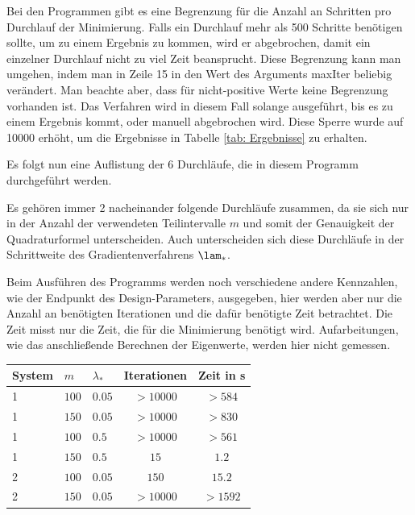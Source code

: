\documentclass[a4paper,12pt]{report}
\newcommand{\zitat}[1]{\glqq #1\grqq}
\newcommand{\1}{\mathds{1}}
\theoremstyle{plain} %
\theoremstyle{definition} %
\theoremstyle{remark}
\begin{document}
            Bei den Programmen gibt es eine Begrenzung für die Anzahl an Schritten pro Durchlauf der Minimierung.
            Falls ein Durchlauf mehr als 500 Schritte benötigen sollte, um zu einem Ergebnis zu kommen, wird er abgebrochen, damit ein einzelner Durchlauf nicht zu viel Zeit beansprucht.
            Diese Begrenzung kann man umgehen, indem man in Zeile 15 in  den Wert des Arguments \mbox{\zitat{maxIter}} beliebig verändert.
            Man beachte aber, dass für nicht-positive Werte keine Begrenzung vorhanden ist.
            Das Verfahren wird in diesem Fall solange ausgeführt, bis es zu einem Ergebnis kommt, oder manuell abgebrochen wird.
            Diese Sperre wurde auf 10000 erhöht, um die Ergebnisse in Tabelle \ref{tab: Ergebnisse} zu erhalten.

            Es folgt nun eine Auflistung der 6 Durchläufe, die in diesem Programm durchgeführt werden.

            Es gehören immer 2 nacheinander folgende Durchläufe zusammen, da sie sich nur in der Anzahl der verwendeten Teilintervalle $m$
            und somit der Genauigkeit der Quadraturformel unterscheiden.
            Auch unterscheiden sich diese Durchläufe in der Schrittweite des Gradientenverfahrens $\lam_*$.

            Beim Ausführen des Programms werden noch verschiedene andere Kennzahlen, wie der Endpunkt des Design-Parameters, ausgegeben,
            hier werden aber nur die Anzahl an benötigten Iterationen und die dafür benötigte Zeit betrachtet.
            Die Zeit misst nur die Zeit, die für die Minimierung benötigt wird.
            Aufarbeitungen, wie das anschließende Berechnen der Eigenwerte, werden hier nicht gemessen. \\

            \begin{table}[ht]
                  \centering
                  \begin{tabular}{lllcc}
                       System & $m$ & $\lambda_*$ & Iterationen & Zeit in s\\
                       \hline
                       1 & $100$ & $0.05$ & $>10000$ & $>584$ \\ 
                       1 & $150$ & $0.05$ & $>10000$ & $>830$ \\
                       \hline
                       1 & $100$ & $0.5$ & $>10000$ & $>561$ \\
                       1 & $150$ & $0.5$ & $15$ & $1.2$ \\
                       \hline
                       2 & $100$ & $0.05$ & $150$ & $15.2$ \\
                       2 & $150$ & $0.05$ & $>10000$ & $>1592$ \\
                       \hline
                  \end{tabular}\\
            \end{table}
\end{document}
